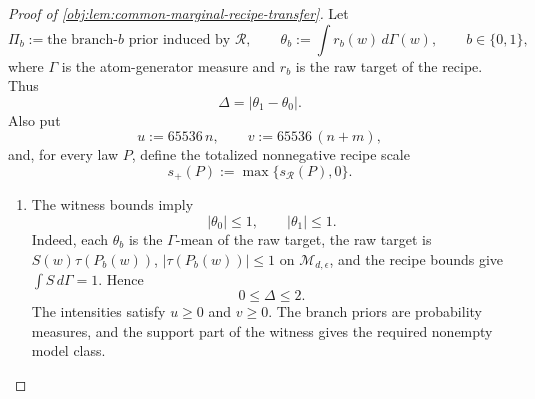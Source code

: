 \begin{proof}[Proof of \cref{obj:lem:common-marginal-recipe-transfer}]
Let
\[
\Pi_b:=\text{the branch-\(b\) prior induced by \(\mathcal R\)},\qquad
\theta_b:=\int r_b(w)\,d\Gamma(w),\qquad b\in\{0,1\},
\]
where \(\Gamma\) is the atom-generator measure and \(r_b\) is the raw target of the recipe.  Thus
\[
\Delta=|\theta_1-\theta_0|.
\]
Also put
\[
u:=65536\,n,\qquad v:=65536\,(n+m),
\]
and, for every law \(P\), define the totalized nonnegative recipe scale
\[
s_+(P):=\max\{s_{\mathcal R}(P),0\}.
\]

\begin{enumerate}
\item The witness bounds imply
\[
|\theta_0|\le 1,\qquad |\theta_1|\le 1.
\]
Indeed, each \(\theta_b\) is the \(\Gamma\)-mean of the raw target, the raw target is \(S(w)\tau(P_b(w))\), \(|\tau(P_b(w))|\le1\) on \(\mathcal M_{d,\epsilon}\), and the recipe bounds give \(\int S\,d\Gamma=1\).  Hence
\[
0\le\Delta\le 2.
\]
The intensities satisfy \(u\ge0\) and \(v\ge0\).  The branch priors are probability measures, and the support part of the witness gives the required nonempty model class. %


\end{enumerate}
\end{proof}
